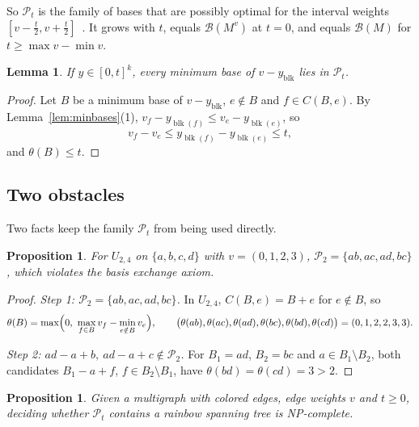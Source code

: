 \documentclass[11pt]{article}
\newtheorem{lemma}[theorem]{Lemma}
\newtheorem{proposition}[theorem]{Proposition}
\newcommand{\blk}{\operatorname{blk}}
\newcommand{\Bases}{\mathcal B}
\newcommand{\Pos}{\mathcal P}
\begin{document}
So $\Pos_t$ is the family of bases that are possibly optimal for the interval
weights $[v-\tfrac t2,v+\tfrac t2]$~\cite{kasperski08}.  It grows with $t$,
equals $\Bases(M^{v})$ at $t=0$, and equals $\Bases(M)$ for
$t\ge\max v-\min v$.

\begin{lemma}
\label{lem:path}
If $y\in[0,t]^{k}$, every minimum base of $v-y_{\blk}$ lies in $\Pos_t$.
\end{lemma}

\begin{proof}
Let $B$ be a minimum base of $v-y_{\blk}$, $e\notin B$ and $f\in C(B,e)$.  By
Lemma~\ref{lem:minbases}(1), $v_f-y_{\blk(f)}\le v_e-y_{\blk(e)}$, so
\[
  v_f-v_e\le y_{\blk(f)}-y_{\blk(e)}\le t,
\]
and $\theta(B)\le t$.
\end{proof}

\subsection{Two obstacles}
\label{sec:obstacles}

Two facts keep the family $\Pos_t$ from being used directly.

\begin{proposition}
\label{prop:notmatroid}
For $U_{2,4}$ on $\{a,b,c,d\}$ with $v=(0,1,2,3)$, $\Pos_2=\{ab,ac,ad,bc\}$,
which violates the basis exchange axiom.
\end{proposition}

\begin{proof}
\emph{Step 1: $\Pos_2=\{ab,ac,ad,bc\}$.}  In $U_{2,4}$, $C(B,e)=B+e$ for
$e\notin B$, so
\[
  \theta(B)=\max\Bigl(0,\ \max_{f\in B}v_f-\min_{e\notin B}v_e\Bigr),\qquad
  \bigl(\theta(ab),\theta(ac),\theta(ad),\theta(bc),\theta(bd),\theta(cd)\bigr)=(0,1,2,2,3,3).
\]

\emph{Step 2: $ad-a+b,\ ad-a+c\notin\Pos_2$.}  For $B_1=ad$, $B_2=bc$ and
$a\in B_1\setminus B_2$, both candidates $B_1-a+f$, $f\in B_2\setminus B_1$, have
$\theta(bd)=\theta(cd)=3>2$.
\end{proof}

\begin{proposition}
\label{prop:nphard}
Given a multigraph with colored edges, edge weights $v$ and $t\ge0$, deciding
whether $\Pos_t$ contains a rainbow spanning tree is NP-complete.
\end{proposition}
\end{document}
